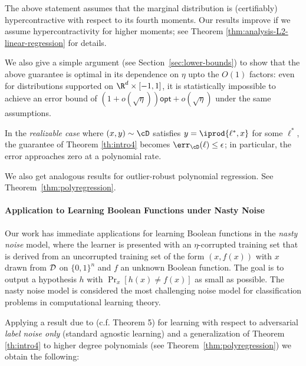 The above statement assumes that the marginal distribution is (certifiably) hypercontractive with respect to its fourth moments.  Our results improve if we assume hypercontractivity for higher moments; see Theorem \ref{thm:analysis-L2-linear-regression} for details. 

We also give a simple argument (see Section~\ref{sec:lower-bounds}) to show that the above guarantee is optimal in its dependence on $\eta$ upto the $O(1)$ factors: even for distributions supported on $\R^d \times [-1,1]$, it is statistically impossible to achieve an error bound of $(1 + o(\sqrt{\eta})) \mathsf{opt} + o(\sqrt{\eta})$ under the same assumptions. 

In the \emph{realizable case} where $(x,y) \sim \cD$ satisfies $y = \iprod{\ell^*,x}$ for some $\ell^*$, the guarantee of Theorem \ref{th:intro4} becomes $\err_\cD(\ell) \leq \epsilon$; in particular, the error approaches zero at a polynomial rate. 

We also get analogous results for outlier-robust polynomial regression. See Theorem~\ref{thm:polyregression}.

 \paragraph{Application to Learning Boolean Functions under Nasty Noise}  Our work has immediate applications for learning Boolean functions in the {\em nasty noise} model, where the learner is presented with an $\eta$-corrupted training set that is derived from an uncorrupted training set of the form $(x,f(x))$ with $x$ drawn from ${\cal D}$ on $\{0,1\}^n$ and $f$ an unknown Boolean function.  The goal is to output a hypothesis $h$ with $\Pr_{x}[h(x) \neq f(x)]$ as small as possible. The nasty noise model is considered the most challenging noise model for classification problems in computational learning theory. 

Applying a result due to \citet{DBLP:journals/siamcomp/KalaiKMS08} (c.f. Theorem 5) for learning with respect to adversarial {\em label noise only} (standard agnostic learning) and a generalization of Theorem \ref{th:intro4} to higher degree polynomials (see Theorem~\ref{thm:polyregression}) we obtain the following:

